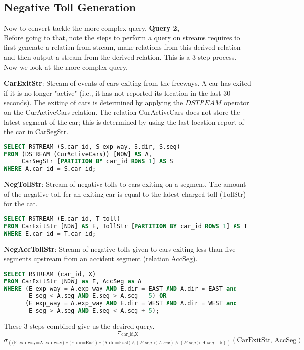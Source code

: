 \subsection{Negative Toll Generation}
Now to convert tackle the more complex query, \textbf{Query 2, }\\
Before going to that, note the steps to perform a query on streams requires to first generate a relation from stream, make relations from this derived relation and then output a stream from the derived relation. This is a 3 step process. \\
Now we look at the more complex query.
\par  \textbf{CarExitStr}: Stream of events of cars exiting from the freeways. A car has exited if it is no longer "active" (i.e., it has not reported its location in the last $30$ seconds). The exiting of cars is determined by applying the $DSTREAM$ operator on the CurActiveCars relation. The relation CurActiveCars does not store the latest segment of the car; this is determined by using the last location report of the car in CarSegStr. 
\begin{lstlisting}[language=SQL]
SELECT RSTREAM (S.car_id, S.exp_way, S.dir, S.seg)
FROM (DSTREAM (CurActiveCars)) [NOW] AS A,
     CarSegStr [PARTITION BY car_id ROWS 1] AS S
WHERE A.car_id = S.car_id;
\end{lstlisting}
\textbf{NegTollStr}: Stream of negative tolls to cars exiting on a segment. The amount of the negative toll for an exiting car is equal to the latest charged toll (TollStr) for the car. 
\begin{lstlisting}[language=SQL]
SELECT RSTREAM (E.car_id, T.toll)
FROM CarExitStr [NOW] AS E, TollStr [PARTITION BY car_id ROWS 1] AS T
WHERE E.car_id = T.car_id;
\end{lstlisting}
\textbf{NegAccTollStr}: Stream of negative tolls given to cars exiting less than five segments upstream from an accident segment (relation AccSeg). 
\begin{lstlisting}[language=SQL]
SELECT RSTREAM (car_id, X)
FROM CarExitStr [NOW] as E, AccSeg as A
WHERE (E.exp_way = A.exp_way AND E.dir = EAST AND A.dir = EAST and 
       E.seg < A.seg AND E.seg > A.seg - 5) OR
      (E.exp_way = A.exp_way AND E.dir = WEST AND A.dir = WEST and 
       E.seg > A.seg AND E.seg < A.seg + 5);
\end{lstlisting}
These 3 steps combined give us the desired query.
$$\pi_{\text{car\_id,X}}$$
$$\sigma_{ (\text{(E.exp\_way=A.exp\_way)} \land \text{(E.dir=East)} \land \text{(A.dir=East)} \land (E.seg < A.seg) \land (E.seg > A.seg - 5) )}(\text{CarExitStr, AccSeg})$$
